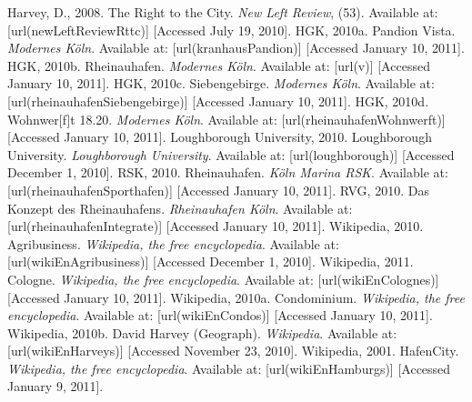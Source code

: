 {%
Harvey, D., 2008. The Right to the City. {\em New Left Review}, (53). Available at:  [url(newLeftReviewRttc)] [Accessed July 19, 2010]. \nl%
%
HGK, 2010a. Pandion Vista. {\em Modernes Köln}. Available at:  [url(kranhausPandion)] [Accessed January 10, 2011]. \nl%
%
HGK, 2010b. Rheinauhafen. {\em Modernes Köln}. Available at:  [url(v)] [Accessed January 10, 2011]. \nl%
%
HGK, 2010c. Siebengebirge. {\em Modernes Köln}. Available at:  [url(rheinauhafenSiebengebirge)] [Accessed January 10, 2011]. \nl%
%
HGK, 2010d. Wohnwer[f]t 18.20. {\em Modernes Köln}. Available at:  [url(rheinauhafenWohnwerft)] [Accessed January 10, 2011]. \nl%
%
Loughborough University, 2010. Loughborough University. {\em Loughborough University}. Available at:  [url(loughborough)] [Accessed December 1, 2010]. \nl%
%
RSK, 2010. Rheinauhafen. {\em Köln Marina RSK}. Available at:  [url(rheinauhafenSporthafen)] [Accessed January 10, 2011]. \nl%
%
RVG, 2010. Das Konzept des Rheinauhafens. {\em Rheinauhafen Köln}. Available at:  [url(rheinauhafenIntegrate)] [Accessed January 10, 2011]. \nl%
%
Wikipedia, 2010. Agribusiness. {\em Wikipedia, the free encyclopedia}. Available at:  [url(wikiEnAgribusiness)] [Accessed December 1, 2010]. \nl%
%
Wikipedia, 2011. Cologne. {\em Wikipedia, the free encyclopedia}. Available at:  [url(wikiEnColognes)] [Accessed January 10, 2011]. \nl%
%
Wikipedia, 2010a. Condominium. {\em Wikipedia, the free encyclopedia}. Available at:  [url(wikiEnCondos)] [Accessed January 10, 2011]. \nl%
%
Wikipedia, 2010b. David Harvey (Geograph). {\em Wikipedia}. Available at:  [url(wikiEnHarveys)] [Accessed November 23, 2010]. \nl%
%
Wikipedia, 2001. HafenCity. {\em Wikipedia, the free encyclopedia}. Available at:  [url(wikiEnHamburgs)] [Accessed January 9, 2011]. \nl%
}

